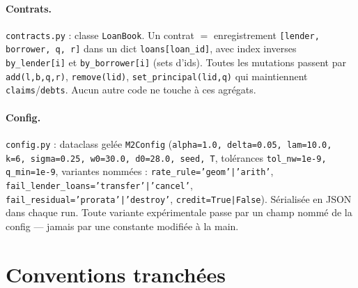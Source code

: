 \documentclass[11pt,a4paper]{article}
\newcommand{\code}[1]{\texttt{#1}}
\begin{document}
\paragraph{Contrats.} \code{contracts.py} : classe \code{LoanBook}.
Un contrat $=$ enregistrement \code{[lender, borrower, q, r]} dans un dict
\code{loans[loan\_id]}, avec index inverses \code{by\_lender[i]} et
\code{by\_borrower[i]} (sets d'ids). Toutes les mutations passent par
\code{add(l,b,q,r)}, \code{remove(lid)}, \code{set\_principal(lid,q)} qui
maintiennent \code{claims}/\code{debts}. Aucun autre code ne touche à ces
agrégats.

\paragraph{Config.} \code{config.py} : dataclass gelée \code{M2Config}
(\code{alpha=1.0, delta=0.05, lam=10.0, k=6, sigma=0.25, w0=30.0, d0=28.0,
seed, T}, tolérances \code{tol\_nw=1e-9, q\_min=1e-9}, variantes nommées :
\code{rate\_rule='geom'|'arith'}, \code{fail\_lender\_loans='transfer'|'cancel'},
\code{fail\_residual='prorata'|'destroy'}, \code{credit=True|False}).
Sérialisée en JSON dans chaque run. Toute variante expérimentale passe par un
champ nommé de la config — jamais par une constante modifiée à la main.

\section{Conventions tranchées}
\end{document}
